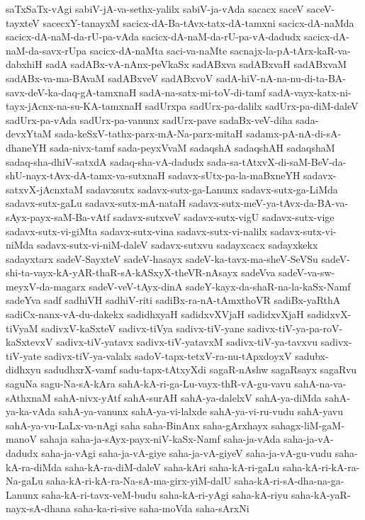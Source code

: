 {saTxSaTx-vAgi
sabiV-jA-va-sethx-yalilx
sabiV-ja-vAda
sacacx
saceV
saceV-tayxteV
sacecxY-tanayxM
sacicx-dA-Ba-tAvx-tatx-dA-tamxni
sacicx-dA-naMda
sacicx-dA-naM-da-rU-pa-vAda
sacicx-dA-naM-da-rU-pa-vA-dadudx
sacicx-dA-naM-da-savx-rUpa
sacicx-dA-naMta
saci-va-naMte
sacnajx-la-pA-tArx-kaR-va-dabxhiH
sadA
sadABx-vA-nAnx-peVkaSx
sadABxva
sadABxvaH
sadABxvaM
sadABx-va-ma-BAvaM
sadABxveV
sadABxvoV
sadA-hiV-nA-na-nu-di-ta-BA-savx-deV-ka-daq-gA-tamxnaH
sadA-na-satx-mi-toV-di-tamf
sadA-vayx-katx-ni-tayx-jAcnx-na-su-KA-tamxnaH
sadUrxpa
sadUrx-pa-dalilx
sadUrx-pa-diM-daleV
sadUrx-pa-vAda
sadUrx-pa-vanunx
sadUrx-pave
sadaBx-veV-diha
sada-devxYtaM
sada-keSxV-tathx-parx-mA-Na-parx-mitaH
sadamx-pA-nA-di-sA-dhaneYH
sada-nivx-tamf
sada-peyxVvaM
sadaqshA
sadaqshAH
sadaqshaM
sadaq-sha-dhiV-satxdA
sadaq-sha-vA-dadudx
sada-sa-tAtxvX-di-saM-BeV-da-shU-nayx-tAvx-dA-tamx-va-sutxnaH
sadavx-sUtx-pa-la-maBxneYH
sadavx-satxvX-jAcnxtaM
sadavxsutx
sadavx-sutx-ga-Lanunx
sadavx-sutx-ga-LiMda
sadavx-sutx-gaLu
sadavx-sutx-mA-nataH
sadavx-sutx-meV-ya-tAvx-da-BA-va-sAyx-payx-saM-Ba-vAtf
sadavx-sutxveV
sadavx-sutx-vigU
sadavx-sutx-vige
sadavx-sutx-vi-giMta
sadavx-sutx-vina
sadavx-sutx-vi-nalilx
sadavx-sutx-vi-niMda
sadavx-sutx-vi-niM-daleV
sadavx-sutxvu
sadayxcacx
sadayxkekx
sadayxtarx
sadeV-SayxteV
sadeV-hasayx
sadeV-ka-tavx-ma-sheV-SeVSu
sadeV-shi-ta-vayx-kA-yAR-thaR-sA-kASxyX-theVR-nAsayx
sadeVva
sadeV-va-sw-meyxV-da-magarx
sadeV-veV-tAyx-dinA
sadeY-kayx-da-shaR-na-la-kaSx-Namf
sadeYva
sadf
sadhiVH
sadhiV-riti
sadiBx-ra-nA-tAmxthoVR
sadiBx-yaRthA
sadiCx-nanx-vA-du-dakekx
sadidhxyaH
sadidxvXVjaH
sadidxvXjaH
sadidxvX-tiVyaM
sadivxV-kaSxteV
sadivx-tiVya
sadivx-tiV-yane
sadivx-tiV-ya-pa-roV-kaSxtevxV
sadivx-tiV-yatavx
sadivx-tiV-yatavxM
sadivx-tiV-ya-tavxvu
sadivx-tiV-yate
sadivx-tiV-ya-valalx
sadoV-tapx-tetxV-ra-nu-tApxdoyxV
sadubx-didhxyu
sadudhxrX-vamf
sadu-tapx-tAtxyXdi
sagaR-nAshw
sagaRsayx
sagaRvu
saguNa
sagu-Na-sA-kAra
sahA-kA-ri-ga-Lu-vayx-thR-vA-gu-vavu
sahA-na-va-sAthxnaM
sahA-nivx-yAtf
sahA-surAH
sahA-ya-dalelxV
sahA-ya-diMda
sahA-ya-ka-vAda
sahA-ya-vanunx
sahA-ya-vi-lalxde
sahA-ya-vi-ru-vudu
sahA-yavu
sahA-ya-vu-LaLx-va-nAgi
saha
saha-BinAnx
saha-gArxhayx
sahagx-liM-gaM-manoV
sahaja
saha-ja-sAyx-payx-niV-kaSx-Namf
saha-ja-vAda
saha-ja-vA-dadudx
saha-ja-vAgi
saha-ja-vA-giye
saha-ja-vA-giyeV
saha-ja-vA-gu-vudu
saha-kA-ra-diMda
saha-kA-ra-diM-daleV
saha-kAri
saha-kA-ri-gaLu
saha-kA-ri-kA-ra-Na-gaLu
saha-kA-ri-kA-ra-Na-sA-ma-girx-yiM-dalU
saha-kA-ri-sA-dha-na-ga-Lanunx
saha-kA-ri-tavx-veM-budu
saha-kA-ri-yAgi
saha-kA-riyu
saha-kA-yaR-nayx-sA-dhana
saha-ka-ri-sive
saha-moVda
saha-sArxNi
}
